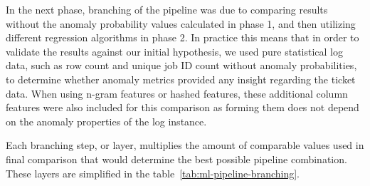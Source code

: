 In the next phase,
branching of the pipeline was due to
comparing results without the anomaly probability values calculated in phase 1,
and then utilizing different regression algorithms in phase 2.
In practice this means
that in order to validate the results against our initial hypothesis,
we used pure statistical log data,
such as row count and unique job ID count
without anomaly probabilities,
to determine whether anomaly metrics provided any insight regarding the ticket data.
When using n-gram features or hashed features,
these additional column features were also included for this comparison
as forming them does not depend on the anomaly properties of the log instance.

Each branching step, or layer,
multiplies the amount of comparable values used in final comparison
that would determine the best possible pipeline combination.
These layers are simplified in the table~\ref{tab:ml-pipeline-branching}.

